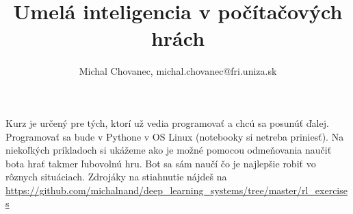 \documentclass[10pt,a5paper]{article}
\begin{document}
\title{Umelá inteligencia v počítačových hrách}
\author{Michal Chovanec,
michal.chovanec@fri.uniza.sk}
\date{}
\maketitle
\thispagestyle{empty}

Kurz je určený pre tých, ktorí už vedia programovať a chcú sa posunúť ďalej.
Programovať sa bude v Pythone v OS Linux (notebooky si netreba priniesť).
Na niekoľkých príkladoch si ukážeme ako je možné pomocou odmeňovania naučiť bota
hrať takmer ľubovolnú hru. Bot sa sám naučí čo je najlepšie robiť vo rôznych situáciach.
Zdrojáky na stiahnutie nájdeš na \url{https://github.com/michalnand/deep\_learning\_systems/tree/master/rl\_exercises}
\\
\\
\end{document}
